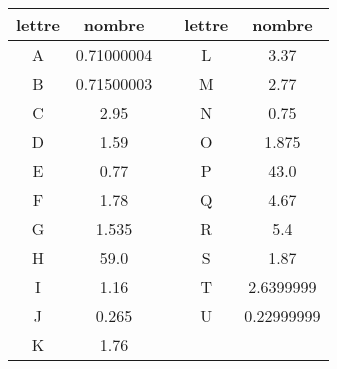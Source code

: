 \documentclass[11pt]{article}
\begin{document}
\begin{tabular}{cS[table-format=5.3,table-auto-round]ccS[table-format=5.3,table-auto-round]}
    \toprule
        lettre & {nombre} && lettre & {nombre} \\
    \midrule
        A	&	0.71000004	&&	L	&	3.37\\
        B	&	0.71500003	&&	M	&	2.77\\
        C	&	2.95	&&	N	&	0.75\\
        D	&	1.59	&&	O	&	1.875\\
        E	&	0.77	&&	P	&	43.0\\
        F	&	1.78	&&	Q	&	4.67\\
        G	&	1.535	&&	R	&	5.4\\
        H	&	59.0	&&	S	&	1.87\\
        I	&	1.16	&&	T	&	2.6399999\\
        J	&	0.265	&&	U	&	0.22999999\\
        K	&	1.76	&&		&	\\
    \bottomrule
\end{tabular}
\end{document}
